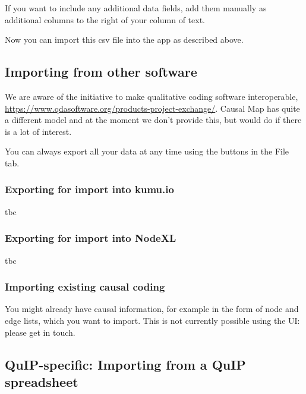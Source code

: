 \documentclass[
]{book}
\begin{document}
If you want to include any additional data fields, add them manually as additional columns to the right of your column of text.

Now you can import this csv file into the app as described above.

\hypertarget{importing-from-other-software}{%
\subsection{Importing from other software}\label{importing-from-other-software}}

We are aware of the initiative to make qualitative coding software interoperable, \url{https://www.qdasoftware.org/products-project-exchange/}. Causal Map has quite a different model and at the moment we don't provide this, but would do if there is a lot of interest.

You can always export all your data at any time using the buttons in the File tab.

\hypertarget{exporting-for-import-into-kumu.io}{%
\subsubsection{Exporting for import into kumu.io}\label{exporting-for-import-into-kumu.io}}

tbc

\hypertarget{exporting-for-import-into-nodexl}{%
\subsubsection{Exporting for import into NodeXL}\label{exporting-for-import-into-nodexl}}

tbc

\hypertarget{importing-existing-causal-coding}{%
\subsubsection{Importing existing causal coding}\label{importing-existing-causal-coding}}

You might already have causal information, for example in the form of node and edge lists, which you want to import. This is not currently possible using the UI: please get in touch.

\hypertarget{quip-specific-importing-from-a-quip-spreadsheet}{%
\subsection{QuIP-specific: Importing from a QuIP spreadsheet}\label{quip-specific-importing-from-a-quip-spreadsheet}}
\end{document}
